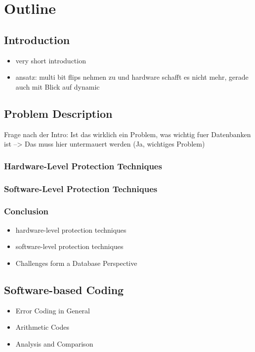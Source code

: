 \section{Outline}

\subsection{Introduction}
\begin{itemize}
\item very short introduction
\item ansatz: multi bit flips nehmen zu und hardware schafft es nicht mehr, gerade auch mit Blick auf dynamic
\end{itemize}
\subsection{Problem Description}
Frage nach der Intro: Ist das wirklich ein Problem, was wichtig fuer Datenbanken ist --> Das muss hier untermauert werden (Ja, wichtiges Problem)

\subsubsection{Hardware-Level Protection Techniques}

\subsubsection{Software-Level Protection Techniques}

\subsubsection{Conclusion}
\begin{itemize}
	\item hardware-level protection techniques
	\item software-level protection techniques
	\item Challenges form a Database Perspective
\end{itemize}
\subsection{Software-based Coding}
\begin{itemize}
	\item Error Coding in General
	\item Arithmetic Codes
	\item Analysis and Comparison
\end{itemize}
